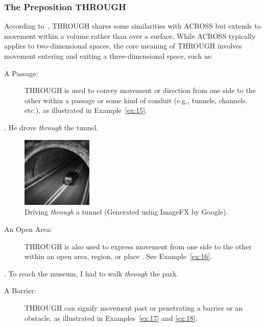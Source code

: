 {{\subsubsection{The Preposition THROUGH}

According to~\textcite{bruckfield2011prepositions}, THROUGH shares some similarities with ACROSS but extends to movement within a volume rather than over a surface. While ACROSS typically applies to two-dimensional spaces, the core meaning of THROUGH involves movement entering and exiting a three-dimensional space, such as:

\begin{description}
    \item[A Passage:] THROUGH is used to convey movement or direction from one side to the other within a passage or some kind of conduit (e.g., tunnels, channels, etc.), as illustrated in Example~\ref{ex:15}.
\end{description}

    \ex. He drove \emph{through} the tunnel. \label{ex:15}

    \begin{figure}[ht]
    \centering
    \includegraphics[width=0.3\textwidth]{textual/Figuras/image_fx_a_car_entering__a_tunnel_black_and_white_seen.jpg}
    \caption{Driving \emph{through} a tunnel (Generated using ImageFX by Google).}
    \label{fig:trough-ex-15}
    \end{figure}
    
\begin{description}
    \item[An Open Area:] THROUGH is also used to express movement from one side to the other within an open area, region, or place \parencite{cambridge-through}. See Example~\ref{ex:16}.
\end{description}

    \ex. To reach the museum, I had to walk \emph{through} the park. \label{ex:16}

\begin{description}
    \item[A Barrier:] THROUGH can signify movement past or penetrating a barrier or an obstacle, as illustrated in Examples~\ref{ex:17} and \ref{ex:18}.
\end{description}
    
}}
